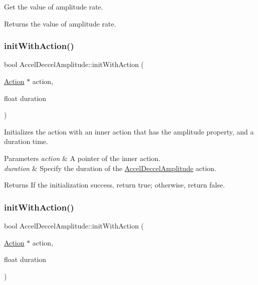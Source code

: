 Get the value of amplitude rate. 

\begin{DoxyReturn}{Returns}
the value of amplitude rate. 
\end{DoxyReturn}
\mbox{\label{classAccelDeccelAmplitude_add6f2f8561d00c2ef3f7802b951ec0ce}} 
\subsubsection{\texorpdfstring{init\+With\+Action()}{initWithAction()}\hspace{0.1cm}{\footnotesize\ttfamily [1/2]}}
{\footnotesize\ttfamily bool Accel\+Deccel\+Amplitude\+::init\+With\+Action (\begin{DoxyParamCaption}\item[{\hyperlink{classAction}{Action} $\ast$}]{action,  }\item[{float}]{duration }\end{DoxyParamCaption})}



Initializes the action with an inner action that has the amplitude property, and a duration time. 


\begin{DoxyParams}{Parameters}
{\em action} & A pointer of the inner action. \\
\hline
{\em duration} & Specify the duration of the \hyperlink{classAccelDeccelAmplitude}{Accel\+Deccel\+Amplitude} action. \\
\hline
\end{DoxyParams}
\begin{DoxyReturn}{Returns}
If the initialization success, return true; otherwise, return false. 
\end{DoxyReturn}
\mbox{\label{classAccelDeccelAmplitude_add6f2f8561d00c2ef3f7802b951ec0ce}} 
\subsubsection{\texorpdfstring{init\+With\+Action()}{initWithAction()}\hspace{0.1cm}{\footnotesize\ttfamily [2/2]}}
{\footnotesize\ttfamily bool Accel\+Deccel\+Amplitude\+::init\+With\+Action (\begin{DoxyParamCaption}\item[{\hyperlink{classAction}{Action} $\ast$}]{action,  }\item[{float}]{duration }\end{DoxyParamCaption})}



